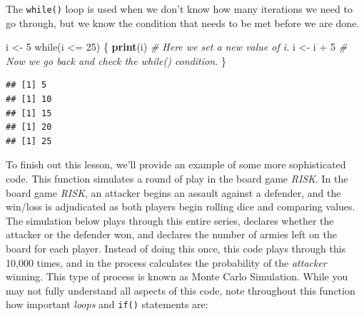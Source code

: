 \documentclass[]{book}
\newenvironment{Shaded}{\begin{snugshade}}{\end{snugshade}}
\newcommand{\KeywordTok}[1]{\textcolor[rgb]{0.13,0.29,0.53}{\textbf{{#1}}}}
\newcommand{\DecValTok}[1]{\textcolor[rgb]{0.00,0.00,0.81}{{#1}}}
\newcommand{\StringTok}[1]{\textcolor[rgb]{0.31,0.60,0.02}{{#1}}}
\newcommand{\CommentTok}[1]{\textcolor[rgb]{0.56,0.35,0.01}{\textit{{#1}}}}
\newcommand{\NormalTok}[1]{{#1}}
\begin{document}
The \texttt{while()} loop is used when we don't know how many iterations
we need to go through, but we know the condition that needs to be met
before we are done.

\begin{Shaded}
\begin{Highlighting}[]
\NormalTok{i <-}\StringTok{ }\DecValTok{5}
\NormalTok{while(i <=}\StringTok{ }\DecValTok{25}\NormalTok{) \{}
  \KeywordTok{print}\NormalTok{(i)}
  \CommentTok{# Here we set a new value of i.}
  \NormalTok{i <-}\StringTok{ }\NormalTok{i +}\StringTok{ }\DecValTok{5}
  \CommentTok{# Now we go back and check the while() condition.}
\NormalTok{\}}
\end{Highlighting}
\end{Shaded}

\begin{verbatim}
## [1] 5
## [1] 10
## [1] 15
## [1] 20
## [1] 25
\end{verbatim}

To finish out this lesson, we'll provide an example of some more
sophisticated code. This function simulates a round of play in the board
game \emph{RISK}. In the board game \emph{RISK}, an attacker begins an
assault against a defender, and the win/loss is adjudicated as both
players begin rolling dice and comparing values. The simulation below
plays through this entire series, declares whether the attacker or the
defender won, and declares the number of armies left on the board for
each player. Instead of doing this once, this code plays through this
10,000 times, and in the process calculates the probability of the
\emph{attacker} winning. This type of process is known as Monte Carlo
Simulation. While you may not fully understand all aspects of this code,
note throughout this function how important \emph{loops} and
\texttt{if()} statements are:
\end{document}
